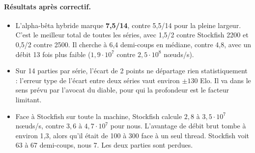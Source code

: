 \paragraph{Résultats après correctif.}
\begin{itemize}
\item L'alpha-bêta hybride marque \textbf{7{,}5/14}, contre 5{,}5/14 pour la pleine largeur. C'est
le meilleur total de toutes les séries, avec 1{,}5/2 contre Stockfish 2200 et 0{,}5/2 contre 2500.
Il cherche à 6{,}4 demi-coups en médiane, contre 4{,}8, avec un débit 13 fois plus faible
($1{,}9\cdot10^7$ contre $2{,}5\cdot10^8$ nœuds/s).
\item Sur 14 parties par série, l'écart de 2 points ne départage rien statistiquement : l'erreur
type de l'écart entre deux séries vaut environ $\pm130$ Elo. Il va dans le sens prévu par l'avocat du diable, pour qui la
profondeur est le facteur limitant.
\item Face à Stockfish sur toute la machine, Stockfish calcule $2{,}8$ à $3{,}5\cdot10^7$ nœuds/s,
contre $3{,}6$ à $4{,}7\cdot10^7$ pour nous. L'avantage de débit brut tombe à environ 1{,}3, alors
qu'il était de 100 à 300 face à un seul thread. Stockfish voit 63 à 67 demi-coups, nous 7. Les deux
parties sont perdues.
\end{itemize}
